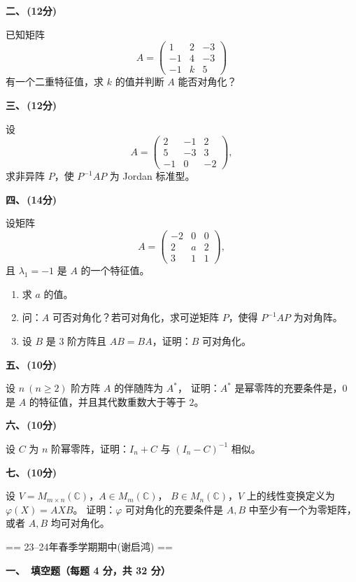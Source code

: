 \textbf{二、\,(12分)}

已知矩阵
$$A = \begin{pmatrix}
    1 & 2 & -3 \\
    -1 & 4 & -3 \\
    -1 & k & 5
\end{pmatrix}$$
有一个二重特征值，求 $k$ 的值并判断 $A$ 能否对角化？

\textbf{三、\,(12分)}

设
$$A = \begin{pmatrix}
    2 & -1 & 2 \\
    5 & -3 & 3 \\
    -1 & 0 & -2
\end{pmatrix},$$
求非异阵 $P$，使 $P^{-1}AP$ 为 Jordan 标准型。

\textbf{四、\,(14分)}

设矩阵
$$A = \begin{pmatrix}
    -2 & 0 & 0 \\
    2 & a & 2 \\
    3 & 1 & 1
\end{pmatrix},$$
且 $\lambda_{1}=-1$ 是 $A$ 的一个特征值。
\begin{enumerate}
    \item[(1)] 求 $a$ 的值。
    \item[(2)] 问：$A$ 可否对角化？若可对角化，求可逆矩阵 $P$，使得 $P^{-1}AP$ 为对角阵。
    \item[(3)] 设 $B$ 是 $3$ 阶方阵且 $AB=BA$，证明：$B$ 可对角化。
\end{enumerate}

\textbf{五、\,(10分)}

设 $n\ (n \ge 2)$ 阶方阵 $A$ 的伴随阵为 $A^*$，
证明：$A^*$ 是幂零阵的充要条件是，$0$ 是 $A$ 的特征值，并且其代数重数大于等于 $2$。

\textbf{六、\,(10分)}

设 $C$ 为 $n$ 阶幂零阵，证明：$I_{n}+C$ 与 $(I_{n}-C)^{-1}$ 相似。

\textbf{七、\,(10分)}

设 $V=M_{m\times n}(\mathbb{C})$，$A\in M_{m}(\mathbb{C})$，
$B\in M_{n}(\mathbb{C})$，$V$ 上的线性变换定义为 $\varphi(X)=AXB$。
证明：$\varphi$ 可对角化的充要条件是 $A, B$ 中至少有一个为零矩阵，或者 $A, B$ 均可对角化。



== 23--24年春季学期期中(谢启鸿) ==


\textbf{一、\ 填空题（每题 4 分，共 32 分）}


